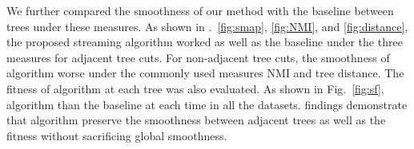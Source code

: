 We further compared the smoothness of our method with the baseline between trees under these measures.
As shown in  .~\ref{fig:smap}, \ref{fig:NMI}, and \ref{fig:distance}, the proposed streaming algorithm worked as well as the baseline under the three measures for adjacent tree cuts.
For non-adjacent tree cuts, the smoothness of  algorithm   worse under the commonly used measures NMI and tree distance.
The fitness of  algorithm at each tree was also evaluated.
As shown in Fig.~\ref{fig:sf},  algorithm   than the baseline at each time in all the datasets.
 findings demonstrate that  algorithm  preserve the smoothness between  adjacent trees as well as the fitness without sacrificing global smoothness. %

